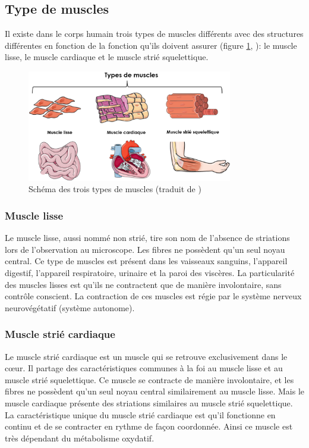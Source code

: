 \subsection{Type de muscles}
Il existe dans le corps humain trois types de muscles différents avec des structures différentes en fonction de la fonction qu'ils doivent assurer (figure \ref{fig:muscle-type}, \cite{gomez_oca_physiological_2021}): le muscle lisse, le muscle cardiaque et le muscle strié squelettique.
\begin{figure}[!ht]
 \centering
 \includegraphics[width=0.8\textwidth]{figures/muscle_type.png}
 \caption[Schéma des trois types de muscles]{Schéma des trois types de muscles (traduit de \cite{gomez_oca_physiological_2021})}
 \label{fig:muscle-type}
\end{figure}
\subsubsection{Muscle lisse}
Le muscle lisse, aussi nommé non strié, tire son nom de l'absence de striations lors de l'observation au microscope. Les fibres ne possèdent qu'un seul noyau central. Ce type de muscles est présent dans les vaisseaux sanguins, l'appareil digestif, l'appareil respiratoire, urinaire et la paroi des viscères. La particularité des muscles lisses est qu'ils ne contractent que de manière involontaire, sans contrôle conscient. La contraction de ces muscles est régie par le système nerveux neurovégétatif (système autonome).

\subsubsection{Muscle strié cardiaque}
Le muscle strié cardiaque est un muscle qui se retrouve exclusivement dans le cœur. Il partage des caractéristiques communes à la foi au muscle lisse et au muscle strié squelettique. Ce muscle se contracte de manière involontaire, et les fibres ne possèdent qu'un seul noyau central similairement au muscle lisse. Mais le muscle cardiaque présente des striations similaires au muscle strié squelettique. La caractéristique unique du muscle strié cardiaque est qu'il fonctionne en continu et de se contracter en rythme de façon coordonnée. Ainsi ce muscle est très dépendant du métabolisme oxydatif.

